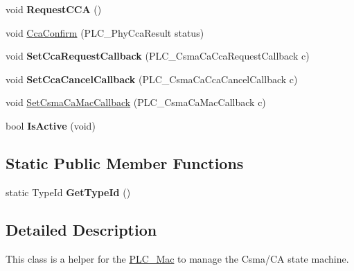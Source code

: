 \begin{DoxyCompactItemize}
\item 
\hypertarget{classns3_1_1PLC__CsmaCa_a31921a4cf106b568a41dc8eccf885dcb}{void {\bfseries \-Request\-C\-C\-A} ()}\label{classns3_1_1PLC__CsmaCa_a31921a4cf106b568a41dc8eccf885dcb}

\item 
void \hyperlink{classns3_1_1PLC__CsmaCa_afeb3613648b3a99a4aac46443487bc70}{\-Cca\-Confirm} (\-P\-L\-C\-\_\-\-Phy\-Cca\-Result status)
\item 
\hypertarget{classns3_1_1PLC__CsmaCa_adf9dfc0681c5c005ddd3a4ee62758866}{void {\bfseries \-Set\-Cca\-Request\-Callback} (\-P\-L\-C\-\_\-\-Csma\-Ca\-Cca\-Request\-Callback c)}\label{classns3_1_1PLC__CsmaCa_adf9dfc0681c5c005ddd3a4ee62758866}

\item 
\hypertarget{classns3_1_1PLC__CsmaCa_a1668a097cf9bbdf7a8ee6b731f7719fc}{void {\bfseries \-Set\-Cca\-Cancel\-Callback} (\-P\-L\-C\-\_\-\-Csma\-Ca\-Cca\-Cancel\-Callback c)}\label{classns3_1_1PLC__CsmaCa_a1668a097cf9bbdf7a8ee6b731f7719fc}

\item 
void \hyperlink{classns3_1_1PLC__CsmaCa_af8a09f1221a1f6aca0daf1c6bb0dd58d}{\-Set\-Csma\-Ca\-Mac\-Callback} (\-P\-L\-C\-\_\-\-Csma\-Ca\-Mac\-Callback c)
\item 
\hypertarget{classns3_1_1PLC__CsmaCa_a7d8466509ec7fe643d1e1bcd0b08de95}{bool {\bfseries \-Is\-Active} (void)}\label{classns3_1_1PLC__CsmaCa_a7d8466509ec7fe643d1e1bcd0b08de95}

\end{DoxyCompactItemize}
\subsection*{\-Static \-Public \-Member \-Functions}
\begin{DoxyCompactItemize}
\item 
\hypertarget{classns3_1_1PLC__CsmaCa_a68af2ff87aaa1e8cd0dd668ac6595b9c}{static \-Type\-Id {\bfseries \-Get\-Type\-Id} ()}\label{classns3_1_1PLC__CsmaCa_a68af2ff87aaa1e8cd0dd668ac6595b9c}

\end{DoxyCompactItemize}


\subsection{\-Detailed \-Description}
\-This class is a helper for the \hyperlink{classns3_1_1PLC__Mac}{\-P\-L\-C\-\_\-\-Mac} to manage the \-Csma/\-C\-A state machine. 

